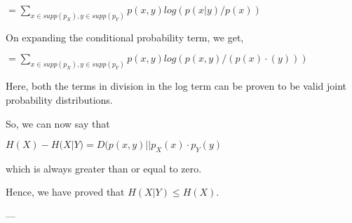 \documentclass{article}
\begin{document}
$= \displaystyle\sum_{x\in supp(p_X), y \in supp(p_Y)}p(x, y) log(p(x|y)/p(x))$

On expanding the conditional probability term, we get,

$= \displaystyle\sum_{x\in supp(p_X), y \in supp(p_Y)}p(x, y) log(p(x, y)/(p(x)\cdotp(y)))$

Here, both the terms in division in the log term can be proven to be valid joint probability distributions.

So, we can now say that

$H(X) - H(X|Y) = D(p(x, y)||p_X(x)\cdot p_Y(y)$

which is always greater than or equal to zero.

Hence, we have proved that $H(X|Y) \leq H(X)$.

---
\end{document}
